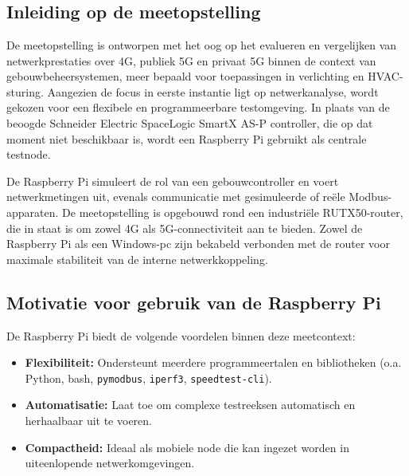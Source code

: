 \chapter{}%
\label{ch:basisopstelling}

\section{Inleiding op de meetopstelling}

De meetopstelling is ontworpen met het oog op het evalueren en vergelijken van netwerkprestaties over 4G, publiek 5G en privaat 5G binnen de context van gebouwbeheersystemen, meer bepaald voor toepassingen in verlichting en HVAC-sturing. Aangezien de focus in eerste instantie ligt op netwerkanalyse, wordt gekozen voor een flexibele en programmeerbare testomgeving. In plaats van de beoogde Schneider Electric SpaceLogic SmartX AS-P controller, die op dat moment niet beschikbaar is, wordt een Raspberry Pi gebruikt als centrale testnode.

De Raspberry Pi simuleert de rol van een gebouwcontroller en voert netwerkmetingen uit, evenals communicatie met gesimuleerde of reële Modbus-apparaten. De meetopstelling is opgebouwd rond een industriële RUTX50-router, die in staat is om zowel 4G als 5G-connectiviteit aan te bieden. Zowel de Raspberry Pi als een Windows-pc zijn bekabeld verbonden met de router voor maximale stabiliteit van de interne netwerkkoppeling.

\section{Motivatie voor gebruik van de Raspberry Pi}

De Raspberry Pi biedt de volgende voordelen binnen deze meetcontext:

\begin{itemize}
    \item \textbf{Flexibiliteit:} Ondersteunt meerdere programmeertalen en bibliotheken (o.a. Python, bash, \texttt{pymodbus}, \texttt{iperf3}, \texttt{speedtest-cli}).
    \item \textbf{Automatisatie:} Laat toe om complexe testreeksen automatisch en herhaalbaar uit te voeren.
    \item \textbf{Compactheid:} Ideaal als mobiele node die kan ingezet worden in uiteenlopende netwerkomgevingen.
\end{itemize}


